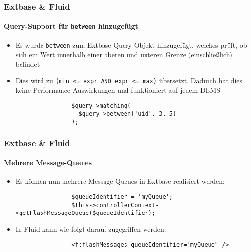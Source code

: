 \begin{frame}[fragile]
	\frametitle{Extbase \& Fluid}
	\framesubtitle{Query-Support für \texttt{between} hinzugefügt}

	\begin{itemize}

		\item Es wurde \texttt{between} zum Extbase Query Objekt hinzugefügt,
			welches prüft, ob sich ein Wert innerhalb einer oberen und unteren
			Grenze (einschließlich) befindet

		\item Dies wird zu \texttt{(min <= expr AND expr <= max)} übersetzt.\newline
			Dadurch hat dies keine Performance-Auswirkungen und funktioniert auf jedem DBMS

			\begin{lstlisting}
				$query->matching(
				  $query->between('uid', 3, 5)
				);
			\end{lstlisting}

	\end{itemize}

\end{frame}


\begin{frame}[fragile]
	\frametitle{Extbase \& Fluid}
	\framesubtitle{Mehrere Message-Queues}

	\begin{itemize}

		\item Es können nun mehrere Message-Queues in Extbase realisiert werden:

			\begin{lstlisting}
				$queueIdentifier = 'myQueue';
				$this->controllerContext->getFlashMessageQueue($queueIdentifier);
			\end{lstlisting}

		\item In Fluid kann wie folgt darauf zugegriffen werden:

			\begin{lstlisting}
				<f:flashMessages queueIdentifier="myQueue" />
			\end{lstlisting}

	\end{itemize}

\end{frame}


